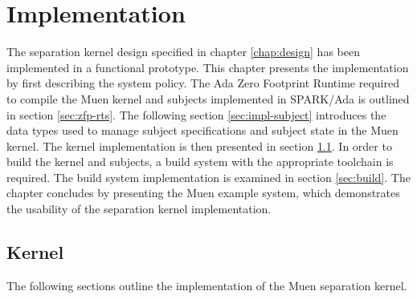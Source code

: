 \chapter{Implementation}\label{chap:impl}
The separation kernel design specified in chapter \ref{chap:design} has been
implemented in a functional prototype. This chapter presents the implementation
by first describing the system policy. The Ada Zero Footprint Runtime required
to compile the Muen kernel and subjects implemented in SPARK/Ada is outlined in
section \ref{sec:zfp-rts}. The following section \ref{sec:impl-subject}
introduces the data types used to manage subject specifications and subject
state in the Muen kernel. The kernel implementation is then presented in
section \ref{sec:kernel}. In order to build the kernel and subjects, a build
system with the appropriate toolchain is required. The build system
implementation is examined in section \ref{sec:build}. The chapter concludes by
presenting the Muen example system, which demonstrates the usability of the
separation kernel implementation.





\section{Kernel}\label{sec:kernel}
The following sections outline the implementation of the Muen separation
kernel.












